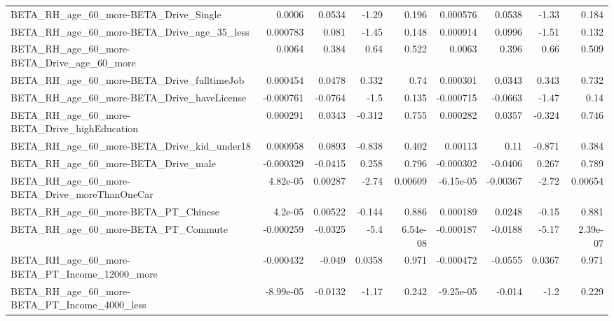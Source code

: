 \begin{tabular}{lrrrrrrrr}
BETA\_RH\_age\_60\_more-BETA\_Drive\_Single              &      0.0006 &       0.0534 &     -1.29 &    0.196 &   0.000576 &      0.0538 &        -1.33 &         0.184 \\
BETA\_RH\_age\_60\_more-BETA\_Drive\_age\_35\_less         &    0.000783 &        0.081 &     -1.45 &    0.148 &   0.000914 &      0.0996 &        -1.51 &         0.132 \\
BETA\_RH\_age\_60\_more-BETA\_Drive\_age\_60\_more         &      0.0064 &        0.384 &      0.64 &    0.522 &     0.0063 &       0.396 &         0.66 &         0.509 \\
BETA\_RH\_age\_60\_more-BETA\_Drive\_fulltimeJob         &    0.000454 &       0.0478 &     0.332 &     0.74 &   0.000301 &      0.0343 &        0.343 &         0.732 \\
BETA\_RH\_age\_60\_more-BETA\_Drive\_haveLicense         &   -0.000761 &      -0.0764 &      -1.5 &    0.135 &  -0.000715 &     -0.0663 &        -1.47 &          0.14 \\
BETA\_RH\_age\_60\_more-BETA\_Drive\_highEducation       &    0.000291 &       0.0343 &    -0.312 &    0.755 &   0.000282 &      0.0357 &       -0.324 &         0.746 \\
BETA\_RH\_age\_60\_more-BETA\_Drive\_kid\_under18         &    0.000958 &       0.0893 &    -0.838 &    0.402 &    0.00113 &        0.11 &       -0.871 &         0.384 \\
BETA\_RH\_age\_60\_more-BETA\_Drive\_male                &   -0.000329 &      -0.0415 &     0.258 &    0.796 &  -0.000302 &     -0.0406 &        0.267 &         0.789 \\
BETA\_RH\_age\_60\_more-BETA\_Drive\_moreThanOneCar      &    4.82e-05 &      0.00287 &     -2.74 &  0.00609 &  -6.15e-05 &    -0.00367 &        -2.72 &       0.00654 \\
BETA\_RH\_age\_60\_more-BETA\_PT\_Chinese                &     4.2e-05 &      0.00522 &    -0.144 &    0.886 &   0.000189 &      0.0248 &        -0.15 &         0.881 \\
BETA\_RH\_age\_60\_more-BETA\_PT\_Commute                &   -0.000259 &      -0.0325 &      -5.4 & 6.54e-08 &  -0.000187 &     -0.0188 &        -5.17 &      2.39e-07 \\
BETA\_RH\_age\_60\_more-BETA\_PT\_Income\_12000\_more      &   -0.000432 &       -0.049 &    0.0358 &    0.971 &  -0.000472 &     -0.0555 &       0.0367 &         0.971 \\
BETA\_RH\_age\_60\_more-BETA\_PT\_Income\_4000\_less       &   -8.99e-05 &      -0.0132 &     -1.17 &    0.242 &  -9.25e-05 &      -0.014 &         -1.2 &         0.229 \\

\end{tabular}
